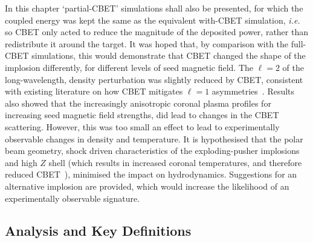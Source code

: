 In this chapter `partial-\ac{CBET}' simulations shall also be presented, for which the coupled energy was kept the same as the equivalent with-\ac{CBET} simulation, \textit{i.e.} so \ac{CBET} only acted to reduce the magnitude of the deposited power, rather than redistribute it around the target.
It was hoped that, by comparison with the full-\ac{CBET} simulations, this would demonstrate that \ac{CBET} changed the shape of the implosion differently, for different levels of seed magnetic field.
The $\ell=2$ of the long-wavelength, density perturbation was slightly reduced by \ac{CBET}, consistent with existing literature on how \ac{CBET} mitigates $\ell=1$ asymmetries~\cite{colaitis_inverse_2021}.
Results also showed that the increasingly anisotropic coronal plasma profiles for increasing seed magnetic field strengths, did lead to changes in the \ac{CBET} scattering.
However, this was too small an effect to lead to experimentally observable changes in density and temperature.
It is hypothesised that the polar beam geometry, shock driven characteristics of the exploding-pusher implosions and high $Z$ shell (which results in increased coronal temperatures, and therefore reduced \ac{CBET}~\cite{colaitis_exploration_2023}), minimised the impact on hydrodynamics.
Suggestions for an alternative implosion are provided, which would increase the likelihood of an experimentally observable signature.

\subsection{Analysis and Key Definitions}%
\label{sec:Res2_analysis_definitions}

